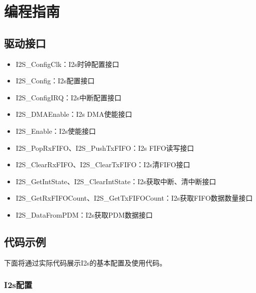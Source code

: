 \documentclass[
  12pt,
]{book}
\begin{document}
\hypertarget{ux7f16ux7a0bux6307ux5357-2}{%
\section{编程指南}\label{ux7f16ux7a0bux6307ux5357-2}}

\hypertarget{ux9a71ux52a8ux63a5ux53e3-2}{%
\subsection{驱动接口}\label{ux9a71ux52a8ux63a5ux53e3-2}}

\begin{itemize}
\item
  I2S\_ConfigClk：I2s时钟配置接口
\item
  I2S\_Config：I2s配置接口
\item
  I2S\_ConfigIRQ：I2s中断配置接口
\item
  I2S\_DMAEnable：I2s DMA使能接口
\item
  I2S\_Enable：I2s使能接口
\item
  I2S\_PopRxFIFO、I2S\_PushTxFIFO：I2s FIFO读写接口
\item
  I2S\_ClearRxFIFO、I2S\_ClearTxFIFO：I2s清FIFO接口
\item
  I2S\_GetIntState、I2S\_ClearIntState：I2s获取中断、清中断接口
\item
  I2S\_GetRxFIFOCount、I2S\_GetTxFIFOCount：I2s获取FIFO数据数量接口
\item
  I2S\_DataFromPDM：I2s获取PDM数据接口
\end{itemize}

\hypertarget{ux4ee3ux7801ux793aux4f8b-2}{%
\subsection{代码示例}\label{ux4ee3ux7801ux793aux4f8b-2}}

下面将通过实际代码展示I2s的基本配置及使用代码。

\hypertarget{i2sux914dux7f6e}{%
\subsubsection{I2s配置}\label{i2sux914dux7f6e}}
\end{document}
